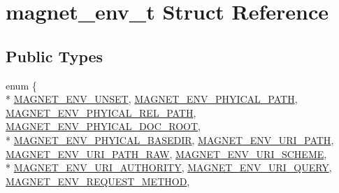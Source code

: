\hypertarget{structmagnet__env__t}{\section{magnet\-\_\-env\-\_\-t Struct Reference}
\label{structmagnet__env__t}
}
\subsection*{Public Types}
\begin{DoxyCompactItemize}
\item 
enum \{ \\*
\hyperlink{structmagnet__env__t_a60cf26abb5b12c72c0cc144a004c05e4ae541ba760975051475e6557631f8b78a}{M\-A\-G\-N\-E\-T\-\_\-\-E\-N\-V\-\_\-\-U\-N\-S\-E\-T}, 
\hyperlink{structmagnet__env__t_a60cf26abb5b12c72c0cc144a004c05e4af483c40ff5116344c72099acddfc8a20}{M\-A\-G\-N\-E\-T\-\_\-\-E\-N\-V\-\_\-\-P\-H\-Y\-I\-C\-A\-L\-\_\-\-P\-A\-T\-H}, 
\hyperlink{structmagnet__env__t_a60cf26abb5b12c72c0cc144a004c05e4ac69dd7edb05c4330247b6005a912ae63}{M\-A\-G\-N\-E\-T\-\_\-\-E\-N\-V\-\_\-\-P\-H\-Y\-I\-C\-A\-L\-\_\-\-R\-E\-L\-\_\-\-P\-A\-T\-H}, 
\hyperlink{structmagnet__env__t_a60cf26abb5b12c72c0cc144a004c05e4a59f722c8f87d50cc98e86da49292d23d}{M\-A\-G\-N\-E\-T\-\_\-\-E\-N\-V\-\_\-\-P\-H\-Y\-I\-C\-A\-L\-\_\-\-D\-O\-C\-\_\-\-R\-O\-O\-T}, 
\\*
\hyperlink{structmagnet__env__t_a60cf26abb5b12c72c0cc144a004c05e4a76532d6303f1b5be13243345bea3898a}{M\-A\-G\-N\-E\-T\-\_\-\-E\-N\-V\-\_\-\-P\-H\-Y\-I\-C\-A\-L\-\_\-\-B\-A\-S\-E\-D\-I\-R}, 
\hyperlink{structmagnet__env__t_a60cf26abb5b12c72c0cc144a004c05e4a78e58ab67b7cc7ead2d9bd4ad7116b2c}{M\-A\-G\-N\-E\-T\-\_\-\-E\-N\-V\-\_\-\-U\-R\-I\-\_\-\-P\-A\-T\-H}, 
\hyperlink{structmagnet__env__t_a60cf26abb5b12c72c0cc144a004c05e4ac643c36809bfc2c00bd7ca576b52dc0a}{M\-A\-G\-N\-E\-T\-\_\-\-E\-N\-V\-\_\-\-U\-R\-I\-\_\-\-P\-A\-T\-H\-\_\-\-R\-A\-W}, 
\hyperlink{structmagnet__env__t_a60cf26abb5b12c72c0cc144a004c05e4abe4aa12b31cd9f88808a197ce8affd4c}{M\-A\-G\-N\-E\-T\-\_\-\-E\-N\-V\-\_\-\-U\-R\-I\-\_\-\-S\-C\-H\-E\-M\-E}, 
\\*
\hyperlink{structmagnet__env__t_a60cf26abb5b12c72c0cc144a004c05e4ae2fbf5a089ec06e6805c103e286ca9e4}{M\-A\-G\-N\-E\-T\-\_\-\-E\-N\-V\-\_\-\-U\-R\-I\-\_\-\-A\-U\-T\-H\-O\-R\-I\-T\-Y}, 
\hyperlink{structmagnet__env__t_a60cf26abb5b12c72c0cc144a004c05e4aab59ad24cb2f08afeabadc2f4eb2f305}{M\-A\-G\-N\-E\-T\-\_\-\-E\-N\-V\-\_\-\-U\-R\-I\-\_\-\-Q\-U\-E\-R\-Y}, 
\hyperlink{structmagnet__env__t_a60cf26abb5b12c72c0cc144a004c05e4a5440eb91acdc3f360858b34d7d45fa24}{M\-A\-G\-N\-E\-T\-\_\-\-E\-N\-V\-\_\-\-R\-E\-Q\-U\-E\-S\-T\-\_\-\-M\-E\-T\-H\-O\-D}, 

\end{DoxyCompactItemize}
